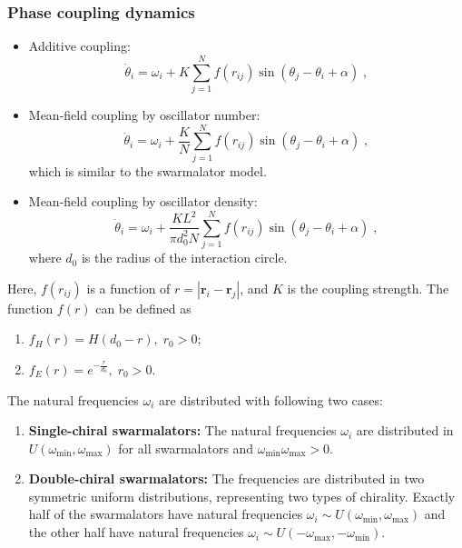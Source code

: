 \documentclass{article}
\begin{document}
\subsubsection{Phase coupling dynamics}
\begin{itemize}
    \item Additive coupling: 
    \begin{equation}
        \label{eq:additionalCouplingDotTheta}
        \dot{\theta}_i=\omega _i+K\sum_{j=1}^{N}f\left( r_{ij} \right)\sin \left( \theta _j-\theta _i+\alpha \right)\;,
    \end{equation}
    \item Mean-field coupling by oscillator number:
    \begin{equation}
        \label{eq:swarmalatorDotTheta}
        \dot{\theta}_i=\omega _i+\frac{K}{N}\sum_{j=1}^N{f}\left( r_{ij} \right) \sin \left( \theta _j-\theta _i+\alpha \right) \;,
    \end{equation}
    which is similar to the swarmalator model.
    \item Mean-field coupling by oscillator density:
    \begin{equation}
        \dot{\theta}_i=\omega _i+\frac{KL^2}{\pi d_{0}^{2}N}\sum_{j=1}^N{f}\left( r_{ij} \right) \sin \left( \theta _j-\theta _i+\alpha \right) \;,
    \end{equation}
    where $d_0$ is the radius of the interaction circle.
\end{itemize}
Here,  $f\left( r_{ij} \right)$ is a function of $r=\left| \mathbf{r}_i-\mathbf{r}_j \right|$, and $K$ is the coupling strength. 
The function $f\left( r \right)$ can be defined as
\begin{enumerate}
    \item $f_H\left( r \right)=H\left( d_0-r \right),\;r_0>0$;
    \item $f_E\left( r \right)=e^{-\frac{r}{d_0}},\;r_0>0$.
\end{enumerate}
The natural frequencies $\omega_i$ are distributed with following two cases:
\begin{enumerate}
    \item \textbf{Single-chiral swarmalators:} The natural frequencies $\omega_i$ are distributed in $U\left( \omega _{\min},\omega _{\max} \right)$ for all swarmalators and $\omega _{\min}\omega _{\max}>0$.
    
    \item \textbf{Double-chiral swarmalators:} The frequencies are distributed in two symmetric uniform distributions, representing two types of chirality. Exactly half of the swarmalators have natural frequencies $\omega_i \sim U\left( \omega _{\min},\omega _{\max} \right)$ and the other half have natural frequencies $\omega_i \sim U\left( -\omega _{\max},-\omega _{\min} \right)$.
\end{enumerate}
\end{document}
